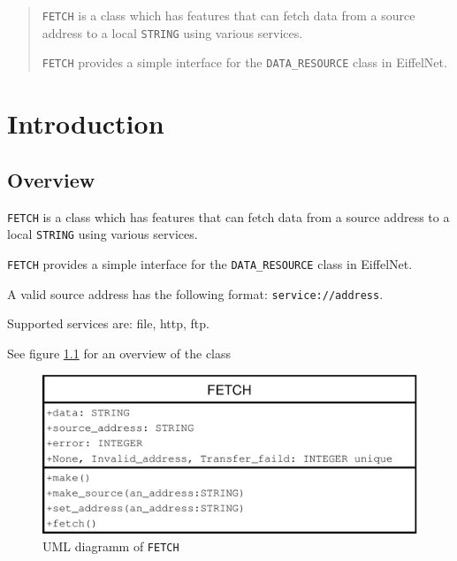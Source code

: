 \documentclass[a4paper,fleqn]{report}
\begin{document}
\begin{abstract}
  \texttt{FETCH} is a class which has features that can fetch data
  from a source address to a local \texttt{STRING} using various
  services.
  
  \texttt{FETCH} provides a simple interface for the
  \texttt{DATA\_RESOURCE} class in EiffelNet.
\end{abstract}

\clearpage
\tableofcontents

\clearpage
\listoffigures

\chapter{Introduction}
\label{cha:introduction}


\setcounter{page}{0} 



\section{Overview}
\label{sec:overview}

\texttt{FETCH} is a class which has features that can fetch data from
a source address to a local \texttt{STRING} using various services.
  
\texttt{FETCH} provides a simple interface for the
\texttt{DATA\_RESOURCE} class in EiffelNet.

A valid source address has the following format:
\texttt{service://address}.

Supported services are: file, http, ftp.

See figure \ref{fig:uml-diagram} for an overview of the class

\begin{figure}[htbp]
  \centering
  \includegraphics[width=\textwidth]{./figures/uml}
  \caption{UML diagramm of \texttt{FETCH}}
  \label{fig:uml-diagram}
\end{figure}
\end{document}
